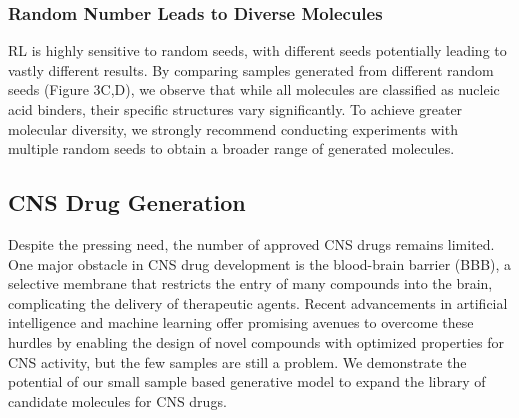 \documentclass[10pt, twocolumn]{article}
\begin{document}


\subsubsection*{Random Number Leads to Diverse Molecules}

RL is highly sensitive to random seeds, with different seeds potentially leading to vastly different results\cite{Henderson2017, Islam2017}. By comparing samples generated from different random seeds (Figure 3C,D), we observe that while all molecules are classified as nucleic acid binders, their specific structures vary significantly. To achieve greater molecular diversity, we strongly recommend conducting experiments with multiple random seeds to obtain a broader range of generated molecules.


\subsection{CNS Drug Generation}

Despite the pressing need, the number of approved CNS drugs remains limited. One major obstacle in CNS drug development is the blood-brain barrier (BBB), a selective membrane that restricts the entry of many compounds into the brain, complicating the delivery of therapeutic agents. Recent advancements in artificial intelligence and machine learning offer promising avenues to overcome these hurdles by enabling the design of novel compounds with optimized properties for CNS activity, but the few samples are still a problem\cite{Morofuji2020}. We demonstrate the potential of our small sample based generative model to expand the library of candidate molecules for CNS drugs.
\end{document}

